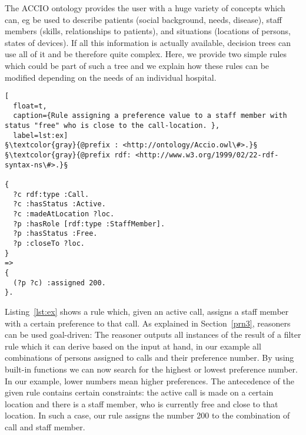  
The ACCIO ontology provides the user with a huge variety of concepts which can, eg be used to describe patients (social background, needs, disease), 
staff members (skills, relationships to patients), and situations (locations of persons, states of devices). If all this information is actually available, decision trees
can use all of it and be therefore quite complex. Here, we provide two simple rules which could be part of such a tree and we explain how these rules can
be modified depending on the needs of an individual hospital.
 
 \begin{lstlisting}[
  float=t,
  caption={Rule assigning a preference value to a staff member with status "free" who is close to the call-location. },
  label=lst:ex]
§\textcolor{gray}{@prefix : <http://ontology/Accio.owl\#>.}§
§\textcolor{gray}{@prefix rdf: <http://www.w3.org/1999/02/22-rdf-syntax-ns\#>.}§

{
  ?c rdf:type :Call.
  ?c :hasStatus :Active. 
  ?c :madeAtLocation ?loc. 
  ?p :hasRole [rdf:type :StaffMember].
  ?p :hasStatus :Free.
  ?p :closeTo ?loc.
}
=>
{
  (?p ?c) :assigned 200.
}.
\end{lstlisting}
 
Listing~\ref{lst:ex} shows a rule which, given an active call, assigns a staff member with a certain preference to that call. 
As explained in Section~\ref{prn3}, \nthree reasoners can be used goal-driven: The reasoner outputs all instances of the result of a filter rule which it can derive 
based on the input at hand, in our example all combinations of persons assigned to calls and their preference number. 
By using built-in functions we can now search for the highest or lowest preference number.
In our example, lower numbers mean higher preferences. The antecedence of the given rule contains certain constraints: the active call is made on a certain location and
there is a staff member, who is currently free and close to that location. In such a case, our rule assigns the number 200 to the combination of call and staff member.

